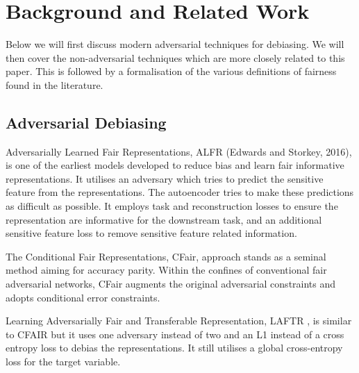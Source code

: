 \section{Background and Related Work}
\label{sec:background}
Below we will first discuss modern adversarial techniques for debiasing. We will then cover the non-adversarial techniques which are more closely related to this paper. This is followed by a formalisation of the various definitions of fairness found in the literature.

\subsection{Adversarial Debiasing}

Adversarially Learned Fair Representations, ALFR (Edwards and Storkey, 2016), is one of the earliest models developed to reduce bias and learn fair informative representations. It utilises an adversary which tries to predict the sensitive feature from the representations. The autoencoder tries to make these predictions as difficult as possible. It employs task and reconstruction losses to ensure the representation are informative for the downstream task, and an additional sensitive feature loss to remove sensitive feature related information.

The Conditional Fair Representations, CFair, approach \cite{zhao2020} stands as a seminal method aiming for accuracy parity. Within the confines of conventional fair adversarial networks, CFair augments the original adversarial constraints and adopts conditional error constraints. 

Learning Adversarially Fair and Transferable Representation, LAFTR \cite{madras2018}, is similar to CFAIR but it uses one adversary instead of two and an L1 instead of a cross entropy loss to debias the representations. It still utilises a global cross-entropy loss for the target variable.


